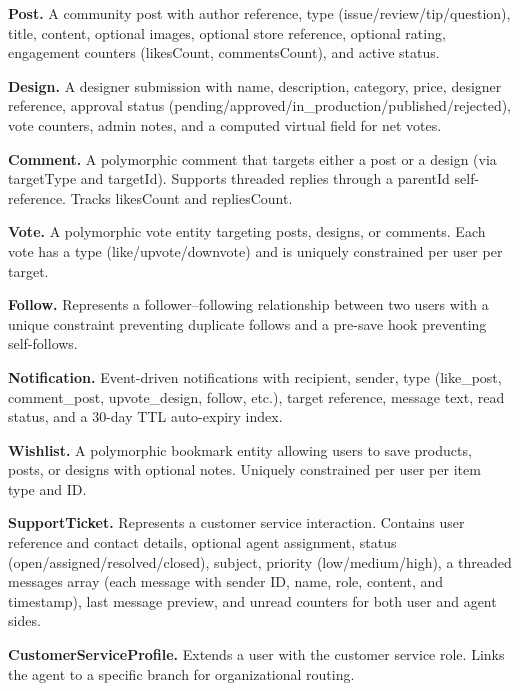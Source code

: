 \textbf{Post.} A community post with author reference, type (issue/review/tip/question), title, content, optional images, optional store reference, optional rating, engagement counters (likesCount, commentsCount), and active status.

\textbf{Design.} A designer submission with name, description, category, price, designer reference, approval status (pending/approved/in\_production/published/rejected), vote counters, admin notes, and a computed virtual field for net votes.

\textbf{Comment.} A polymorphic comment that targets either a post or a design (via targetType and targetId). Supports threaded replies through a parentId self-reference. Tracks likesCount and repliesCount.

\textbf{Vote.} A polymorphic vote entity targeting posts, designs, or comments. Each vote has a type (like/upvote/downvote) and is uniquely constrained per user per target.

\textbf{Follow.} Represents a follower--following relationship between two users with a unique constraint preventing duplicate follows and a pre-save hook preventing self-follows.

\textbf{Notification.} Event-driven notifications with recipient, sender, type (like\_post, comment\_post, upvote\_design, follow, etc.), target reference, message text, read status, and a 30-day TTL auto-expiry index.

\textbf{Wishlist.} A polymorphic bookmark entity allowing users to save products, posts, or designs with optional notes. Uniquely constrained per user per item type and ID.

\textbf{SupportTicket.} Represents a customer service interaction. Contains user reference and contact details, optional agent assignment, status (open/assigned/resolved/closed), subject, priority (low/medium/high), a threaded messages array (each message with sender ID, name, role, content, and timestamp), last message preview, and unread counters for both user and agent sides.

\textbf{CustomerServiceProfile.} Extends a user with the customer service role. Links the agent to a specific branch for organizational routing.

